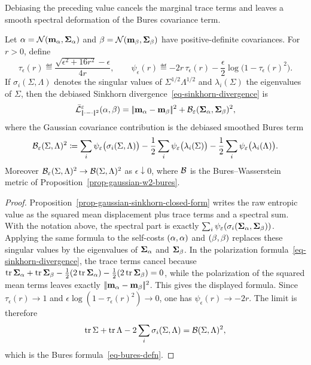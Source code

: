 Debiasing the preceding value cancels the marginal trace terms and leaves a smooth spectral deformation of the Bures covariance term.

\begin{cor}\label{cor-gaussian-sinkhorn-divergence}
	Let $\alpha=\mathcal{N}(\mathbf{m}_\alpha,\mathbf{\Sigma}_\alpha)$ and $\beta=\mathcal{N}(\mathbf{m}_\beta,\mathbf{\Sigma}_\beta)$ have positive-definite covariances. For $r>0$, define
	\[
		\tau_\epsilon(r)
		\eqdef
		\frac{\sqrt{\epsilon^2+16r^2}-\epsilon}{4r},
		\qquad
		\psi_\epsilon(r)
		\eqdef
		-2r\,\tau_\epsilon(r)
		-\frac{\epsilon}{2}\log\bigl(1-\tau_\epsilon(r)^2\bigr).
	\]
	If $\sigma_i(\Sigma,\Lambda)$ denotes the singular values of $\Sigma^{1/2}\Lambda^{1/2}$ and $\lambda_i(\Sigma)$ the eigenvalues of $\Sigma$, then the debiased Sinkhorn divergence~\eqref{eq-sinkhorn-divergence} is
	\[
		\bar{\mathcal{L}}_{|\!| \cdot-\cdot |\!|^2}^{\varepsilon}(\alpha,\beta)
		=
		|\!| \mathbf{m}_\alpha-\mathbf{m}_\beta |\!|^2
		+
		\mathcal{B}_\varepsilon(\mathbf{\Sigma}_\alpha,\mathbf{\Sigma}_\beta)^2,
	\]
	where the Gaussian covariance contribution is the debiased smoothed Bures term
	\[
		\mathcal{B}_\varepsilon(\Sigma,\Lambda)^2
		\coloneqq
		\sum_i \psi_\varepsilon\bigl(\sigma_i(\Sigma,\Lambda)\bigr)
		-\frac12\sum_i\psi_\varepsilon\bigl(\lambda_i(\Sigma)\bigr)
		-\frac12\sum_i\psi_\varepsilon\bigl(\lambda_i(\Lambda)\bigr).
	\]
	Moreover $\mathcal{B}_\varepsilon(\Sigma,\Lambda)^2\to\mathcal{B}(\Sigma,\Lambda)^2$ as $\epsilon\downarrow0$, where $\mathcal{B}$ is the Bures--Wasserstein metric of Proposition~\ref{prop-gaussian-w2-bures}.
\end{cor}

\begin{proof}
	Proposition~\ref{prop-gaussian-sinkhorn-closed-form} writes the raw entropic value as the squared mean displacement plus trace terms and a spectral sum. With the notation above, the spectral part is exactly $\sum_i\psi_\varepsilon(\sigma_i(\mathbf{\Sigma}_\alpha,\mathbf{\Sigma}_\beta))$. Applying the same formula to the self-costs $(\alpha,\alpha)$ and $(\beta,\beta)$ replaces these singular values by the eigenvalues of $\mathbf{\Sigma}_\alpha$ and $\mathbf{\Sigma}_\beta$. In the polarization formula~\eqref{eq-sinkhorn-divergence}, the trace terms cancel because
	$\operatorname{tr}\mathbf{\Sigma}_\alpha+\operatorname{tr}\mathbf{\Sigma}_\beta-\frac12(2\operatorname{tr}\mathbf{\Sigma}_\alpha)-\frac12(2\operatorname{tr}\mathbf{\Sigma}_\beta)=0$, while the polarization of the squared mean terms leaves exactly $|\!| \mathbf{m}_\alpha-\mathbf{m}_\beta |\!|^2$. This gives the displayed formula. Since $\tau_\epsilon(r)\to1$ and $\epsilon\log(1-\tau_\epsilon(r)^2)\to0$, one has $\psi_\epsilon(r)\to-2r$. The limit is therefore
	\[
		\operatorname{tr}\Sigma+\operatorname{tr}\Lambda
		-2\sum_i\sigma_i(\Sigma,\Lambda)
		=
		\mathcal{B}(\Sigma,\Lambda)^2,
	\]
	which is the Bures formula~\eqref{eq-bures-defn}.
\end{proof}


